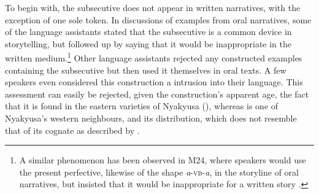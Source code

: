 To begin with, the subsecutive does not appear in written narratives, with the exception of one sole token. In discussions of examples from oral narratives, some of the language assistants stated that the subsecutive is a common device in storytelling, but followed up by saying that it would be inappropriate in the written medium.\footnote{A similar phenomenon has been observed in  M24, where speakers would use the present perfective, likewise of the shape \textit{a}-\textsc{vb}-\textit{a}, in the storyline of oral narratives, but insisted that it would be inappropriate for a written story \citep[24]{EatonH2015a}.} Other language assistants rejected any constructed examples containing the subsecutive but then used it themselves in oral texts. A few speakers even considered this construction a  intrusion into their language. This assessment can easily be rejected, given the construction's apparent age, the fact that it is found in the eastern varieties of Nyakyusa (), whereas  is one of Nyakyusa's western neighbours, and its distribution, which does not resemble that of its  cognate as described by \citet{BotneR2008}.

\largerpage
